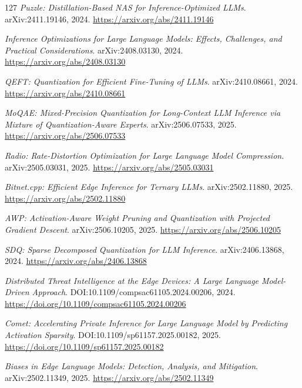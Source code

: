 \documentclass[11pt,a4paper]{article}
\begin{document}
\begin{thebibliography}{127}
\newblock \emph{Puzzle: Distillation-Based NAS for Inference-Optimized LLMs}.
\newblock arXiv:2411.19146, 2024.
\newblock \url{https://arxiv.org/abs/2411.19146}

\newblock \emph{Inference Optimizations for Large Language Models: Effects, Challenges, and Practical Considerations}.
\newblock arXiv:2408.03130, 2024.
\newblock \url{https://arxiv.org/abs/2408.03130}

\newblock \emph{QEFT: Quantization for Efficient Fine-Tuning of LLMs}.
\newblock arXiv:2410.08661, 2024.
\newblock \url{https://arxiv.org/abs/2410.08661}

\newblock \emph{MoQAE: Mixed-Precision Quantization for Long-Context LLM Inference via Mixture of Quantization-Aware Experts}.
\newblock arXiv:2506.07533, 2025.
\newblock \url{https://arxiv.org/abs/2506.07533}

\newblock \emph{Radio: Rate-Distortion Optimization for Large Language Model Compression}.
\newblock arXiv:2505.03031, 2025.
\newblock \url{https://arxiv.org/abs/2505.03031}

\newblock \emph{Bitnet.cpp: Efficient Edge Inference for Ternary LLMs}.
\newblock arXiv:2502.11880, 2025.
\newblock \url{https://arxiv.org/abs/2502.11880}

\newblock \emph{AWP: Activation-Aware Weight Pruning and Quantization with Projected Gradient Descent}.
\newblock arXiv:2506.10205, 2025.
\newblock \url{https://arxiv.org/abs/2506.10205}

\newblock \emph{SDQ: Sparse Decomposed Quantization for LLM Inference}.
\newblock arXiv:2406.13868, 2024.
\newblock \url{https://arxiv.org/abs/2406.13868}

\newblock \emph{Distributed Threat Intelligence at the Edge Devices: A Large Language Model-Driven Approach}.
\newblock DOI:10.1109/compsac61105.2024.00206, 2024.
\newblock \url{https://doi.org/10.1109/compsac61105.2024.00206}

\newblock \emph{Comet: Accelerating Private Inference for Large Language Model by Predicting Activation Sparsity}.
\newblock DOI:10.1109/sp61157.2025.00182, 2025.
\newblock \url{https://doi.org/10.1109/sp61157.2025.00182}

\newblock \emph{Biases in Edge Language Models: Detection, Analysis, and Mitigation}.
\newblock arXiv:2502.11349, 2025.
\newblock \url{https://arxiv.org/abs/2502.11349}


\end{thebibliography}
\end{document}
